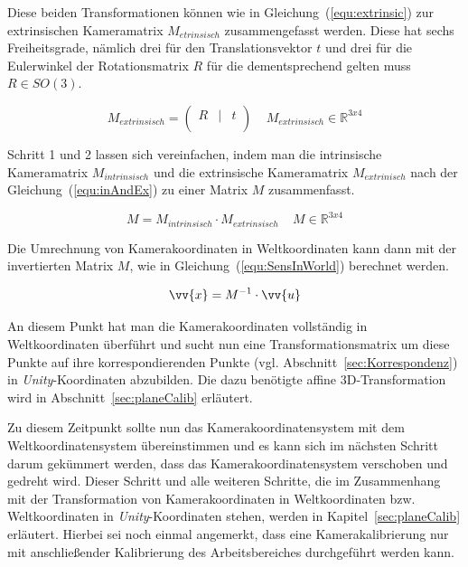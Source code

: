 \begin{description}
Diese beiden Transformationen können wie in Gleichung~(\ref{equ:extrinsic}) zur extrinsischen Kameramatrix $M_{etrinsisch}$ zusammengefasst werden. Diese hat sechs Freiheitsgrade, nämlich drei für den Translationsvektor $t$ und drei für die Eulerwinkel der Rotationsmatrix $R$ für die dementsprechend gelten muss $R \in SO(3)$. 

\begin{equation}
\label{equ:extrinsic}
M_{extrinsisch}= 
\begin{pmatrix}
R &|& t \\
\end{pmatrix} 
~ ~ ~ ~ ~M_{extrinsisch} \in \mathbb{R}^{3x4}
\end{equation}

Schritt 1 und 2 lassen sich vereinfachen, indem man die intrinsische Kameramatrix $M_{intrinsisch}$ und die extrinsische Kameramatrix $M_{extrinisch}$ nach der Gleichung~(\ref{equ:inAndEx}) zu einer Matrix $M$ zusammenfasst.

\begin{equation}
\label{equ:inAndEx}
M = M_{intrinsisch} \cdot M_{extrinsisch}~ ~ ~ ~ ~M\in \mathbb{R}^{3x4}
\end{equation}

Die Umrechnung von Kamerakoordinaten in Weltkoordinaten kann dann mit der invertierten Matrix $M$, wie in Gleichung~(\ref{equ:SensInWorld}) berechnet werden. \

\begin{equation}
\label{equ:SensInWorld}
\vv{x} = M^{-1} \cdot \vv{u}
\end{equation}

An diesem Punkt hat man die Kamerakoordinaten vollständig in Weltkoordinaten überführt und sucht nun eine Transformationsmatrix um diese Punkte auf ihre korrespondierenden Punkte (vgl. Abschnitt~\ref{sec:Korrespondenz}) in \emph{Unity}-Koordinaten abzubilden. Die dazu benötigte affine 3D-Transformation wird in Abschnitt~\ref{sec:planeCalib} erläutert.
\end{description}

Zu diesem Zeitpunkt sollte nun das Kamerakoordinatensystem mit dem Weltkoordinatensystem übereinstimmen und es kann sich im nächsten Schritt darum gekümmert werden, dass das Kamerakoordinatensystem verschoben und gedreht wird. Dieser Schritt und alle weiteren Schritte, die im Zusammenhang mit der Transformation von Kamerakoordinaten in Weltkoordinaten bzw. Weltkoordinaten in \emph{Unity}-Koordinaten stehen, werden in Kapitel~\ref{sec:planeCalib} erläutert. Hierbei sei noch einmal angemerkt, dass eine Kamerakalibrierung nur mit anschließender Kalibrierung des Arbeitsbereiches durchgeführt werden kann.


